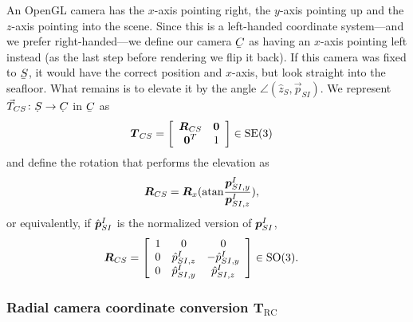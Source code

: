 An OpenGL camera has the $x$-axis pointing right, the $y$-axis pointing up and the $z$-axis pointing into the scene. Since this is a left-handed coordinate system---and we prefer right-handed---we define our camera $\ubar{C}$ as having an $x$-axis pointing left instead (as the last step before rendering we flip it back). If this camera was fixed to $\ubar{S}$, it would have the correct position and $x$-axis, but look straight into the seafloor. What remains is to elevate it by the angle $\angle(\hat{z}_S,\vec{p}_{SI})$. We represent $\vec{T}_{CS}\colon \udot{S}\to\udot{C}$ in $\ubar{C}$ as
%
%
%
\begin{align}
\dvec{T}_{CS} &= 
\left[\begin{array}{c c}
 \mat{R}_{CS}  & \dvec{0} \\%
 \dvec{0}^T  &  1
\end{array}\right] \in \mathrm{SE}(3) \label{eq_T_CS}
\end{align}
%
and define the rotation that performs the elevation as
%
\begin{align}
\dvec{R}_{CS} &= \mat{R}_x(\mathrm{atan}\frac{\dvec{p}_{SI,y}^I}{\dvec{p}_{SI,z}^I}),\label{eq_R_CS_angle}
\end{align}
%
or equivalently, if $\hat{\boldsymbol{p}}_{SI}^I$ is the normalized version of $\boldsymbol{p}_{SI}^I$,
%
\begin{align}
\dvec{R}_{CS} &=
\left[\begin{array}{c c c}
 1 & 0                 & 0                 \\%
 0 & \hat{{p}}_{SI,z}^I & -\hat{{p}}_{SI,y}^I \\
 0 & \hat{{p}}_{SI,y}^I &  \hat{{p}}_{SI,z}^I 
\end{array}\right] \in \mathrm{SO}(3). \label{eq_R_CS_coordinate}
\end{align}


\subsubsection{Radial camera coordinate conversion T$_{\mathrm{RC}}$}


